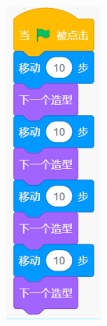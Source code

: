 \documentclass[10pt, a4paper]{article}
\begin{document}
\begin{enumerate}
\begin{figure}[htbp]
\begin{minipage}[t]{.23\textwidth}
\begin{minipage}[t]{.3\textwidth}
                    \includegraphics[width=\textwidth]{8-2.png}

\end{minipage}
\end{minipage}
\end{figure}
\end{enumerate}
\end{document}
